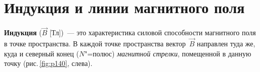 \documentclass[main.tex]{subfiles}
\begin{document}

\pagestyle{empty}

 

\setcounter{section}{29
}
\addtocounter{section}{-1} 

\section{Индукция и линии магнитного поля}


\textbf{Индукция} ($\vec B$ [Тл])~--- это характеристика силовой способности магнитного поля в точке пространства. В каждой точке пространства вектор~$\vec B$ направлен туда же, куда и северный конец ($N$"=полюс) \emph{магнитной стрелки}, помещенной в данную точку (рис.\,\ref{fig:p140}, слева). 
\end{document}
